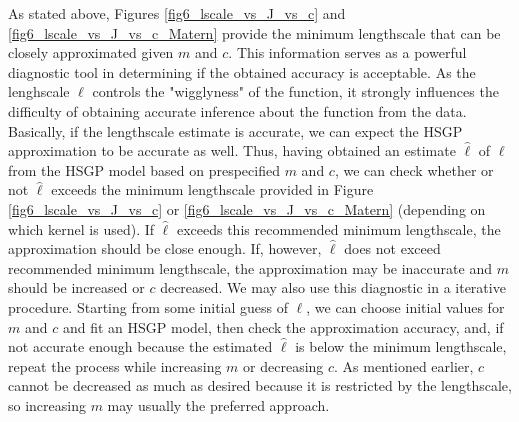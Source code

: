 \documentclass[onecolumn,a4paper,11pt]{article}
\begin{document}
As stated above, Figures \ref{fig6_lscale_vs_J_vs_c} and \ref{fig6_lscale_vs_J_vs_c_Matern} provide the minimum lengthscale that can be closely approximated given $m$ and $c$. This information serves as a powerful diagnostic tool in determining if the obtained accuracy is acceptable. As the lenghscale $\ell$ controls the "wigglyness" of
the function, it strongly influences the difficulty of obtaining accurate
inference about the function from the data. Basically, if the lengthscale estimate is accurate, 
we can expect the HSGP approximation to be accurate as well. Thus, having obtained an estimate $\hat{\ell}$ of $\ell$ from the HSGP model based on prespecified $m$ and $c$, we can check whether or not $\hat{\ell}$ exceeds the minimum lengthscale provided in Figure \ref{fig6_lscale_vs_J_vs_c} or \ref{fig6_lscale_vs_J_vs_c_Matern} (depending on which kernel is used). If $\hat{\ell}$ exceeds this recommended minimum lengthscale, the approximation should be close enough. If, however, $\hat{\ell}$ does not exceed recommended minimum lengthscale, the approximation may be inaccurate and $m$ should be increased or $c$ decreased. We may also use this diagnostic in a iterative procedure.
Starting from some initial guess of $\ell$, we can choose initial values for $m$ and $c$ and fit an HSGP model, then check the approximation accuracy, and, if not accurate enough because the estimated $\hat{\ell}$ is below the minimum lengthscale, repeat the process while increasing $m$ or decreasing $c$.
As mentioned earlier, $c$ cannot be decreased as much as desired because it is restricted by the lengthscale, so increasing $m$ may usually the preferred approach.
\end{document}
